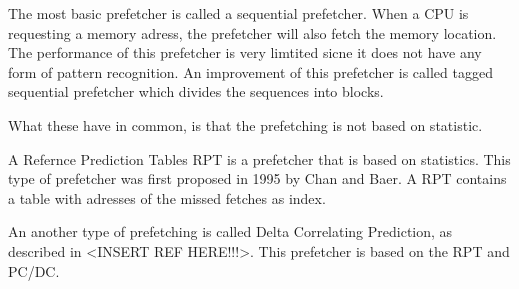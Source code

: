 The most basic prefetcher is called a sequential prefetcher. When a CPU is requesting a memory adress, the prefetcher will also fetch the memory location. The performance of this prefetcher is very limtited sicne it does not have any form of pattern recognition. An improvement of this prefetcher is called tagged sequential prefetcher which divides the sequences into blocks.

What these have in common, is that the prefetching is not based on statistic.  

A Refernce Prediction Tables RPT is a prefetcher that is based on statistics. This type of prefetcher was first proposed in 1995 by Chan and Baer. A RPT contains a table with adresses of the missed fetches as index.

An another type of prefetching is called Delta Correlating Prediction, as described in <INSERT REF HERE!!!>. This prefetcher is based on the RPT and PC/DC.
